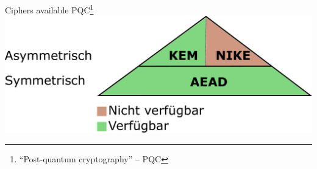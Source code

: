 \documentclass{rosenpass-beamer}
\let\say\enquote
\begin{document}
\begin{frame}{Ciphers available PQC\footnote{\say{Post-quantum cryptography} -- PQC}}
  \includegraphics[height=.6\textheight]{graphics/Primitivenpyramide.pdf}
\end{frame}

\end{document}
